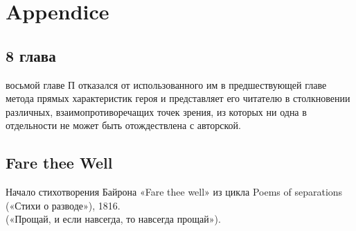 \appendix %
\chapter{Appendice}
\section{8 глава}
восьмой главе П отказался от использованного им в предшествующей главе метода прямых характеристик героя и представляет его читателю в столкновении различных, взаимопротиворечащих точек зрения, из которых ни одна в отдельности не может быть 
отождествлена с авторской.
\section{Fare thee Well}
\label{sec:fare} 
Начало стихотворения Байрона «Fare thee well» из цикла Poems of separations («Стихи о разводе»), 1816.\\
(«Прощай, и если навсегда, то навсегда прощай»).
